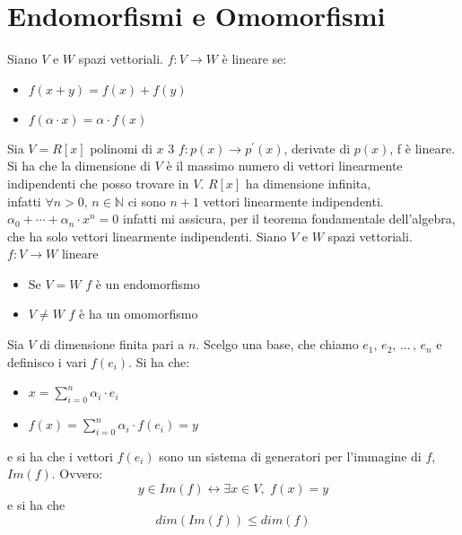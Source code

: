 \documentclass[a4paper,12pt, oneside]{book}
\begin{document}
\section{Endomorfismi e Omomorfismi}
Siano $V$ e $W$ spazi vettoriali. $f:V\rightarrow W $ è lineare se:
\begin{itemize}
\item $f(x+y)=f(x)+f(y)$
\item $f(\alpha\cdot x)=\alpha\cdot f(x)$
\end{itemize}
Sia $V=R[x]$ polinomi di $x$ 3 $f:p(x)\rightarrow p^{'}(x)$, derivate di $p(x)$, f è lineare. Si ha che la dimensione di $V$ è il massimo numero di vettori linearmente indipendenti che posso trovare in $V$. $R[x]$ ha dimensione infinita, \\infatti $\forall n>0, \, n\in \mathbb{N}$ ci sono $n+1$ vettori linearmente indipendenti. $\alpha_0+\cdots+\alpha_n\cdot x^n=0$ infatti mi assicura, per il teorema fondamentale dell'algebra, che ha solo vettori linearmente indipendenti.
Siano $V$ e $W$ spazi vettoriali. $f:V\rightarrow W $ lineare
\begin{itemize}
\item Se $V=W$ $f$ è un endomorfismo
\item $V\neq W$ $f$ è ha un omomorfismo
\end{itemize}
Sia $V$ di dimensione finita pari a $n$. Scelgo una base, che chiamo $e_1,\, e_2,\, ... \,,\, e_n$ e definisco i vari $f(e_i)$. Si ha che:
\begin{itemize}
\item $x=\sum_{i=0}^n \alpha_i \cdot e_i$
\item $f(x)=\sum_{i=0}^n \alpha_i \cdot f(e_i)=y$
\end{itemize}
e si ha che i vettori $f(e_i)$ sono un sistema di generatori per l'immagine di $f$, $Im(f)$. Ovvero:
$$y\in Im(f) \longleftrightarrow \exists x\in V ,\,\, f(x)=y$$
e si ha che $$dim(Im(f))\leq dim(f)$$
\end{document}
